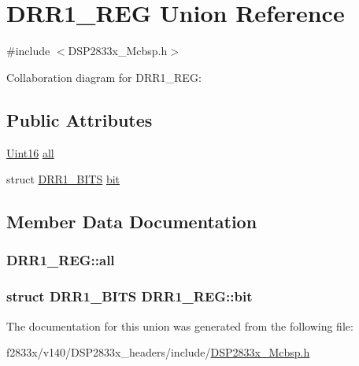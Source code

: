 \hypertarget{union_d_r_r1___r_e_g}{}\section{D\+R\+R1\+\_\+\+R\+E\+G Union Reference}
\label{union_d_r_r1___r_e_g}


{\ttfamily \#include $<$D\+S\+P2833x\+\_\+\+Mcbsp.\+h$>$}



Collaboration diagram for D\+R\+R1\+\_\+\+R\+E\+G\+:
\subsection*{Public Attributes}
\begin{DoxyCompactItemize}
\item 
\hyperlink{_d_s_p2833x___device_8h_a59a9f6be4562c327cbfb4f7e8e18f08b}{Uint16} \hyperlink{union_d_r_r1___r_e_g_aee82f8b3bdbd7ab8433f7195a28f2998}{all}
\item 
struct \hyperlink{struct_d_r_r1___b_i_t_s}{D\+R\+R1\+\_\+\+B\+I\+T\+S} \hyperlink{union_d_r_r1___r_e_g_aad82640f49b81a3b10fc4189b8099773}{bit}
\end{DoxyCompactItemize}


\subsection{Member Data Documentation}
\hypertarget{union_d_r_r1___r_e_g_aee82f8b3bdbd7ab8433f7195a28f2998}{}
\subsubsection[{all}]{ D\+R\+R1\+\_\+\+R\+E\+G\+::all}\label{union_d_r_r1___r_e_g_aee82f8b3bdbd7ab8433f7195a28f2998}
\hypertarget{union_d_r_r1___r_e_g_aad82640f49b81a3b10fc4189b8099773}{}
\subsubsection[{bit}]{\setlength{\rightskip}{0pt plus 5cm}struct {\bf D\+R\+R1\+\_\+\+B\+I\+T\+S} D\+R\+R1\+\_\+\+R\+E\+G\+::bit}\label{union_d_r_r1___r_e_g_aad82640f49b81a3b10fc4189b8099773}


The documentation for this union was generated from the following file\+:\begin{DoxyCompactItemize}
\item 
f2833x/v140/\+D\+S\+P2833x\+\_\+headers/include/\hyperlink{_d_s_p2833x___mcbsp_8h}{D\+S\+P2833x\+\_\+\+Mcbsp.\+h}\end{DoxyCompactItemize}
